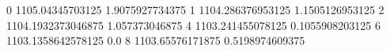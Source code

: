 0 1105.04345703125 1.9075927734375
1 1104.286376953125 1.1505126953125
2 1104.1932373046875 1.057373046875
4 1103.241455078125 0.1055908203125
6 1103.1358642578125 0.0
8 1103.65576171875 0.5198974609375

